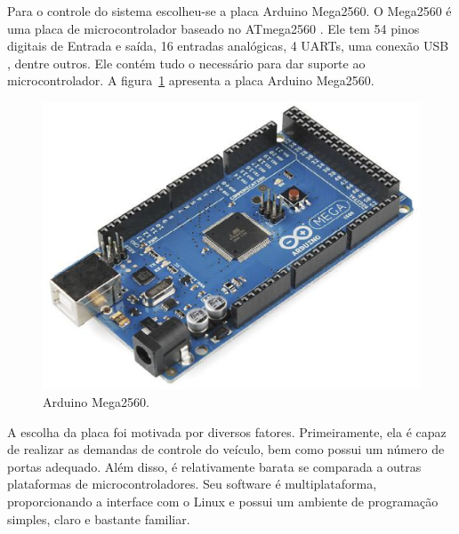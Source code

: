   Para o controle do sistema escolheu-se a placa Arduino Mega2560.
  O Mega2560 é uma placa de microcontrolador baseado no ATmega2560 .
  Ele tem 54 pinos digitais de Entrada e saída, 16 entradas analógicas,
  4 UARTs, uma conexão USB , dentre outros. Ele contém tudo o necessário
  para dar suporte ao microcontrolador. A figura~\ref{fig:arduino} apresenta a placa
  Arduino Mega2560.

  \begin{figure}[!htbp]
  \begin{center}
  \includegraphics[width=.6\textwidth]{figuras/arduino.eps}
  \caption{\label{fig:arduino}Arduino Mega2560.}
  \end{center}
  \end{figure}

  A escolha da placa foi motivada por diversos fatores.
  Primeiramente, ela é capaz de realizar as demandas de controle do
  veículo, bem como possui um número de portas adequado. Além disso,
  é relativamente barata se comparada a outras plataformas de
  microcontroladores. Seu software é multiplataforma, proporcionando
  a interface com o Linux e possui um ambiente de programação simples,
  claro e bastante familiar.

